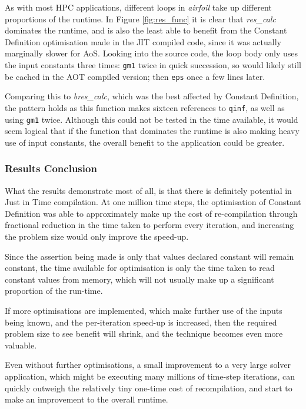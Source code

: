 
\noindent As with most HPC applications, different loops in \textit{airfoil} take up different proportions of the runtime. In Figure \ref{fig:res_func} it is clear that \textit{res\_calc} dominates the runtime, and is also the least able to benefit from the Constant Definition optimisation made in the JIT compiled code, since it was actually marginally slower for AoS. Looking into the source code, the loop body only uses the input constants three times: \verb|gm1| twice in quick succession, so would likely still be cached in the AOT compiled version; then \verb|eps| once a few lines later.
\par
Comparing this to \textit{bres\_calc}, which was the best affected by Constant Definition, the pattern holds as this function makes sixteen references to \verb|qinf|, as well as using \verb|gm1| twice. Although this could not be tested in the time available, it would seem logical that if the function that dominates the runtime is also making heavy use of input constants, the overall benefit to the application could be greater.
\par
\subsubsection{Results Conclusion}
What the results demonstrate most of all, is that there is definitely potential in Just in Time compilation. At one million time steps, the optimisation of Constant Definition was able to approximately make up the cost of re-compilation through fractional reduction in the time taken to perform every iteration, and increasing the problem size would only improve the speed-up.
\par
Since the assertion being made is only that values declared constant will remain constant, the time available for optimisation is only the time taken to read constant values from memory, which will not usually make up a significant proportion of the run-time.
\par
If more optimisations are implemented, which make further use of the inputs being known, and the per-iteration speed-up is increased, then the required problem size to see benefit will shrink, and the technique becomes even more valuable.
\par
Even without further optimisations, a small improvement to a very large solver application, which might be executing many millions of time-step iterations, can quickly outweigh the relatively tiny one-time cost of recompilation, and start to make an improvement to the overall runtime.

